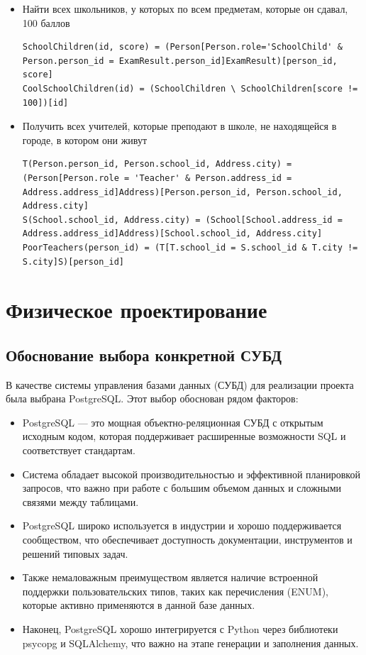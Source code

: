\documentclass[a4paper]{article}
\begin{document}
\begin{itemize}
      \item Найти всех школьников, у которых по всем предметам, которые он сдавал, 100 баллов
            \begin{lstlisting}[basicstyle=\ttfamily\small, breaklines=true, frame=none, numbers=none]
SchoolChildren(id, score) = (Person[Person.role='SchoolChild' & Person.person_id = ExamResult.person_id]ExamResult)[person_id, score]
CoolSchoolChildren(id) = (SchoolChildren \ SchoolChildren[score != 100])[id]
            \end{lstlisting}

      \item Получить всех учителей, которые преподают в школе, не находящейся в городе, в котором они живут
            \begin{lstlisting}[basicstyle=\ttfamily\small, breaklines=true, frame=none, numbers=none]
T(Person.person_id, Person.school_id, Address.city) = (Person[Person.role = 'Teacher' & Person.address_id = Address.address_id]Address)[Person.person_id, Person.school_id, Address.city]
S(School.school_id, Address.city) = (School[School.address_id = Address.address_id]Address)[School.school_id, Address.city]
PoorTeachers(person_id) = (T[T.school_id = S.school_id & T.city != S.city]S)[person_id]
\end{lstlisting}
\end{itemize}


\section{Физическое проектирование}
\subsection{Обоснование выбора конкретной СУБД}
В качестве системы управления базами данных (СУБД) для реализации проекта была
выбрана PostgreSQL. Этот выбор обоснован рядом факторов:
\begin{itemize}
      \item PostgreSQL — это мощная объектно-реляционная СУБД с открытым исходным кодом, которая поддерживает расширенные возможности SQL и соответствует стандартам.
      \item Система обладает высокой производительностью и эффективной планировкой запросов, что важно при работе с большим объемом данных и сложными связями между таблицами.
      \item PostgreSQL широко используется в индустрии и хорошо поддерживается сообществом, что обеспечивает доступность документации, инструментов и решений типовых задач.
      \item Также немаловажным преимуществом является наличие встроенной поддержки пользовательских типов, таких как перечисления (ENUM), которые активно применяются в данной базе данных.
      \item Наконец, PostgreSQL хорошо интегрируется с Python через библиотеки psycopg и SQLAlchemy, что важно на этапе генерации и заполнения данных.
\end{itemize}
\end{document}
